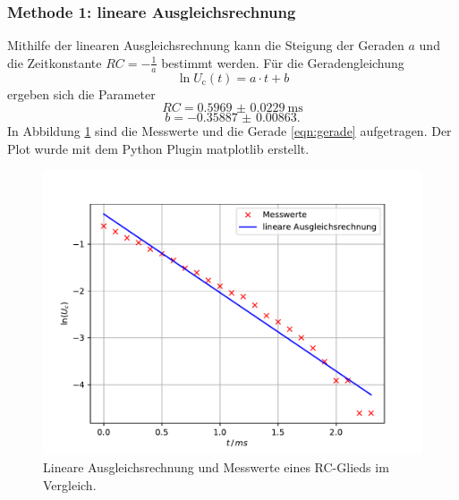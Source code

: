 \subsubsection{Methode 1: lineare Ausgleichsrechnung}
\label{sec:met1}
Mithilfe der linearen Ausgleichsrechnung kann die Steigung der Geraden $a$ und die Zeitkonstante $RC=-\frac{1}{a}$ bestimmt werden.
Für die Geradengleichung
\begin{equation}
    \ln U_\text{c}(t) = a \cdot t + b
    \label{eqn:gerade}
\end{equation}
ergeben sich die Parameter
\begin{equation*}
    RC = \SI{0.5969(229)}{\milli\second}
\end{equation*}
\begin{equation*}
    b = \SI{-0.35887(863)} .
\end{equation*}
In Abbildung \ref{fig:plota} sind die Messwerte und die Gerade \ref{eqn:gerade} aufgetragen.
Der Plot wurde mit dem Python Plugin matplotlib \cite{matplotlib} erstellt.
\begin{figure}
    \centering
    \includegraphics[width=\textwidth]{content/data/plota.pdf}
    \caption{Lineare Ausgleichsrechnung und Messwerte eines RC-Glieds im Vergleich.}
    \label{fig:plota}
\end{figure}
\FloatBarrier

